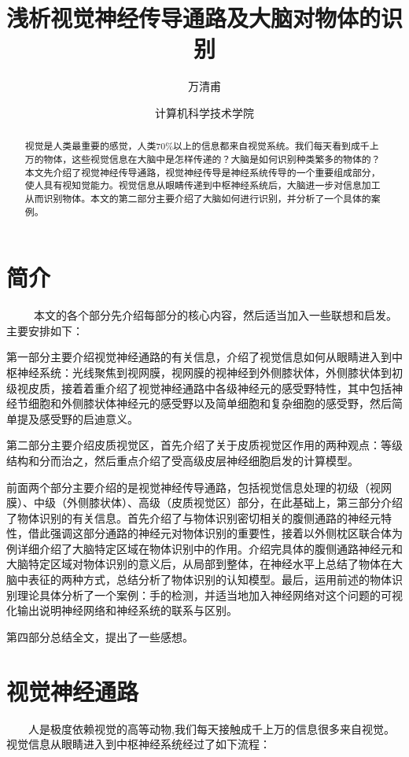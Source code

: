 \documentclass{article}
\title{\textbf{浅析视觉神经传导通路及大脑对物体的识别}}
\author{万清甫
\and
计算机科学技术学院
}
\begin{document}
\maketitle
\begin{spacing}{1.0}
\begin{abstract}
视觉是人类最重要的感觉，人类70\%以上的信息都来自视觉系统。我们每天看到成千上万的物体，这些视觉信息在大脑中是怎样传递的？大脑是如何识别种类繁多的物体的？本文先介绍了视觉神经传导通路，视觉神经传导是神经系统传导的一个重要组成部分，使人具有视知觉能力。视觉信息从眼睛传递到中枢神经系统后，大脑进一步对信息加工从而识别物体。本文的第二部分主要介绍了大脑如何进行识别，并分析了一个具体的案例。
\end{abstract}
\section{简介}
\ \ \ \ \ 本文的各个部分先介绍每部分的核心内容，然后适当加入一些联想和启发。主要安排如下：\par 
	第一部分主要介绍视觉神经通路的有关信息，介绍了视觉信息如何从眼睛进入到中枢神经系统：光线聚焦到视网膜，视网膜的视神经到外侧膝状体，外侧膝状体到初级视皮质，接着着重介绍了视觉神经通路中各级神经元的感受野特性，其中包括神经节细胞和外侧膝状体神经元的感受野以及简单细胞和复杂细胞的感受野，然后简单提及感受野的启迪意义。 \par 
	第二部分主要介绍皮质视觉区，首先介绍了关于皮质视觉区作用的两种观点：等级结构和分而治之，然后重点介绍了受高级皮层神经细胞启发的计算模型。\par 
	前面两个部分主要介绍的是视觉神经传导通路，包括视觉信息处理的初级（视网膜）、中级（外侧膝状体）、高级（皮质视觉区）部分，在此基础上，第三部分介绍了物体识别的有关信息。首先介绍了与物体识别密切相关的腹侧通路的神经元特性，借此强调这部分通路的神经元对物体识别的重要性，接着以外侧枕区联合体为例详细介绍了大脑特定区域在物体识别中的作用。介绍完具体的腹侧通路神经元和大脑特定区域对物体识别的意义后，从局部到整体，在神经水平上总结了物体在大脑中表征的两种方式，总结分析了物体识别的认知模型。最后，运用前述的物体识别理论具体分析了一个案例：手的检测，并适当地加入神经网络对这个问题的可视化输出说明神经网络和神经系统的联系与区别。\par 
	第四部分总结全文，提出了一些感想。
\section{视觉神经通路}
\ \ \ \ 人是极度依赖视觉的高等动物,我们每天接触成千上万的信息很多来自视觉。视觉信息从眼睛进入到中枢神经系统经过了如下流程：

\end{spacing}
\end{document}
